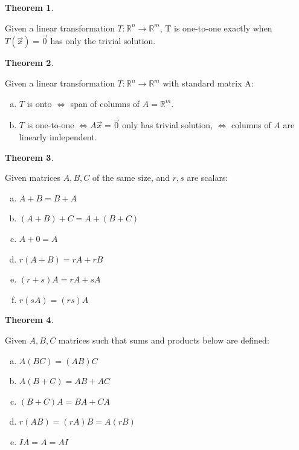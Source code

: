 \documentclass[a4paper,12pt]{article}
\theoremstyle{definition}
\newtheorem{theorem}{Theorem}
\theoremstyle{definition}
\newcommand{\mateq}[3]{#1#2 = #3}
\newcommand{\mateqaxo}{\mateq{A}{\vec{x}}{\vec{0}}}
\begin{document}
	\begin{theorem}
		\label{thm:lin-trans-one-to-one-thm}
		
		Given a linear transformation $T: \mathbb{R}^n \rightarrow \mathbb{R}^m$, T is one-to-one exactly when $\mateq{T}{(\vec{x})}{\vec{0}}$ has only the trivial solution.
	\end{theorem}
	
	\begin{theorem}
		\label{thm:onto-and-one-to-one-thm}
		
		Given a linear transformation $T: \mathbb{R}^n \rightarrow \mathbb{R}^m$ with standard matrix A:
		\begin{enumerate}[a.]
			\item $T$ is onto $\Leftrightarrow$ span of columns of $A = \mathbb{R}^m$.
			
			\item $T$ is one-to-one $\Leftrightarrow \mateqaxo$ only has trivial solution, $\Leftrightarrow$ columns of $A$ are linearly independent.
		\end{enumerate}
	\end{theorem}
	
	\begin{theorem}
		\label{thm:mat-add-sclmult-props}
		
		Given matrices $A, B, C$ of the same size, and $r, s$ are scalars:
		\begin{enumerate}[a.]
			\item $A + B = B + A$
			\item $(A + B) + C = A + (B + C)$
			\item $A + 0 = A$
			\item $r(A + B) = rA + rB$
			\item $(r + s)A = rA + sA$
			\item $r(sA) = (rs)A$
		\end{enumerate}
	\end{theorem}
	
	\begin{theorem}
		\label{thm:mat-mult-props}
		
		Given $A, B, C$ matrices such that sums and products below are defined:
		
		\begin{enumerate}[a.]
			\item $A(BC) = (AB)C$
			\item $A(B + C) = AB + AC$
			\item $(B + C)A = BA + CA$
			\item $r(AB) = (rA)B = A(rB)$
			\item $IA = A = AI$
		\end{enumerate}
	\end{theorem}
	
\end{document}
